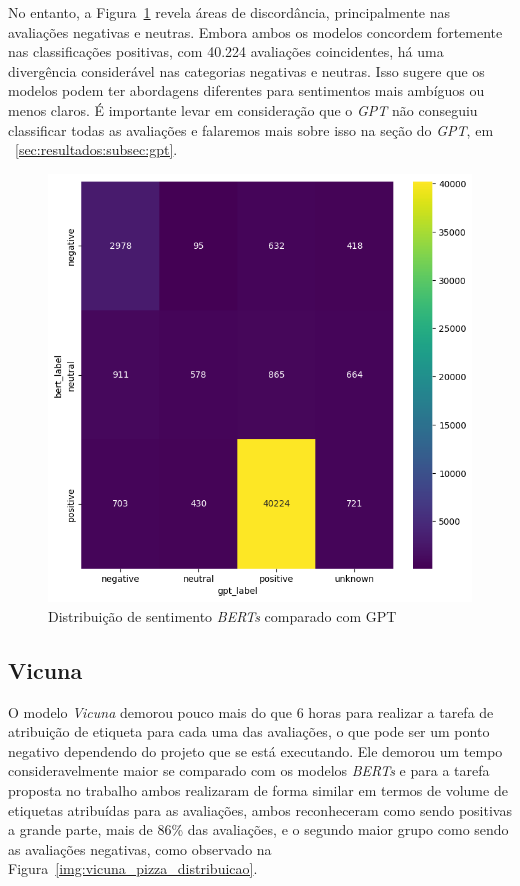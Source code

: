No entanto, a Figura~\ref{img:heat_bert_vs_gpt} revela áreas de discordância, principalmente nas avaliações negativas e neutras. Embora ambos os modelos concordem fortemente nas classificações positivas, com 40.224 avaliações coincidentes, há uma divergência considerável nas categorias negativas e neutras. Isso sugere que os modelos podem ter abordagens diferentes para sentimentos mais ambíguos ou menos claros. É importante levar em consideração que o \textit{GPT} não conseguiu classificar todas as avaliações e falaremos mais sobre isso na seção do \textit{GPT}, em ~\ref{sec:resultados:subsec:gpt}.

\begin{figure}
	\centering
	\includegraphics[width=.8\textwidth]{figs/bert/heat_vs_gpt.png}
	\caption{Distribuição de sentimento \textit{BERTs} comparado com GPT}
	\label{img:heat_bert_vs_gpt}
\end{figure}


\subsection{Vicuna}
\label{sec:resultados:subsec:vicuna}


O modelo \textit{Vicuna} demorou pouco mais do que 6 horas para realizar a tarefa de atribuição de etiqueta para cada uma das avaliações, o que pode ser um ponto negativo dependendo do projeto que se está executando. Ele demorou um tempo consideravelmente maior se comparado com os modelos \textit{BERTs} e para a tarefa proposta no trabalho ambos realizaram de forma similar em termos de volume de etiquetas atribuídas para as avaliações, ambos reconheceram como sendo positivas a grande parte, mais de 86\% das avaliações, e o segundo maior grupo como sendo as avaliações negativas, como observado na Figura~\ref{img:vicuna_pizza_distribuicao}.

